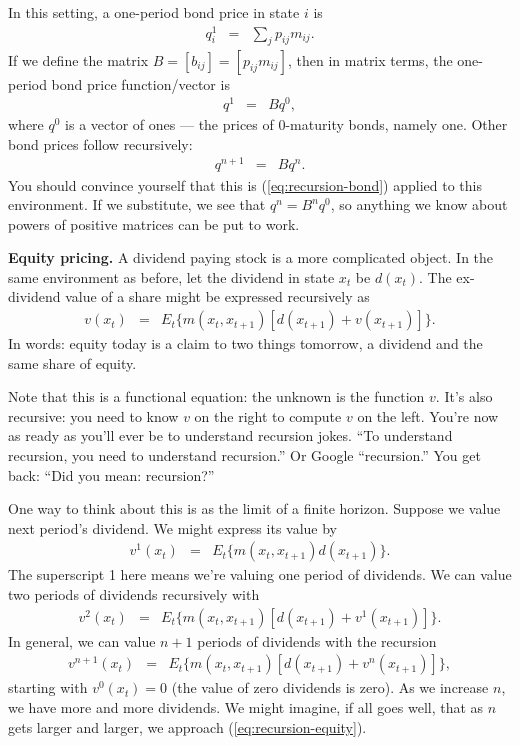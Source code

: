\documentclass[11pt]{article}
\begin{document}
In this setting, a one-period bond price in state $i$ is
\begin{eqnarray*}
    q^1_i &=& \sum_j p_{ij} m_{ij} .
\end{eqnarray*}
If we define the matrix $B = [b_{ij}] = [p_{ij} m_{ij}]$,
then in matrix terms, the one-period bond price function/vector is
\begin{eqnarray*}
    q^1 &=& B q^0 ,
\end{eqnarray*}
where $q^0$ is a vector of ones ---
the prices of 0-maturity bonds, namely one.
 Other bond prices follow recursively:
\begin{eqnarray*}
    q^{n+1} &=& B q^n .
\end{eqnarray*}
You should convince yourself that this is (\ref{eq:recursion-bond})
applied to this environment.
If we substitute, we see that $q^n = B^n q^0 $, so anything we know
about powers of positive matrices can be put to work.

{\bf Equity pricing.\/}
A dividend paying stock is a more complicated object.
In the same environment as before, let the dividend in state $x_t$ be $d(x_t)$.
The ex-dividend value of a share might be expressed recursively as
\begin{eqnarray}
    v(x_t) &=& E_t \big\{ m(x_t,x_{t+1}) [d(x_{t+1}) + v(x_{t+1})] \big\} .
    \label{eq:recursion-equity}
\end{eqnarray}
In words:  equity today is a claim to two things tomorrow,
a dividend and the same share of equity.

Note that this is a functional equation:  the unknown is the function $v$.
It's also recursive:  you need to know $v$ on the right to compute $v$ on the left.
You're now as ready as you'll ever be to understand recursion jokes.
``To understand recursion, you need to understand recursion.''
Or Google ``recursion.'' You get back:  ``Did you mean: recursion?''

One way to think about this is as the limit of a finite horizon.
Suppose we value next period's dividend.  We might express its value by
\begin{eqnarray*}
    v^1(x_t) &=& E_t \big\{ m(x_t,x_{t+1}) d(x_{t+1}) \big\} .
\end{eqnarray*}
The superscript 1 here means we're valuing one period of dividends.
We can value two periods of dividends recursively with
\begin{eqnarray*}
    v^2(x_t) &=& E_t \big\{ m(x_t,x_{t+1}) [d(x_{t+1}) + v^1(x_{t+1})] \big\} .
\end{eqnarray*}
In general, we can value $n+1$ periods of dividends with the recursion
\begin{eqnarray*}
    v^{n+1}(x_t) &=& E_t \big\{ m(x_t,x_{t+1}) [d(x_{t+1}) + v^n(x_{t+1})] \big\} ,
\end{eqnarray*}
starting with $v^0(x_t) = 0$ (the value of zero dividends is zero).
As we increase $n$, we have more and more dividends.
We might imagine, if all goes well, that as $n$ gets larger and larger,
we approach (\ref{eq:recursion-equity}).
\end{document}
